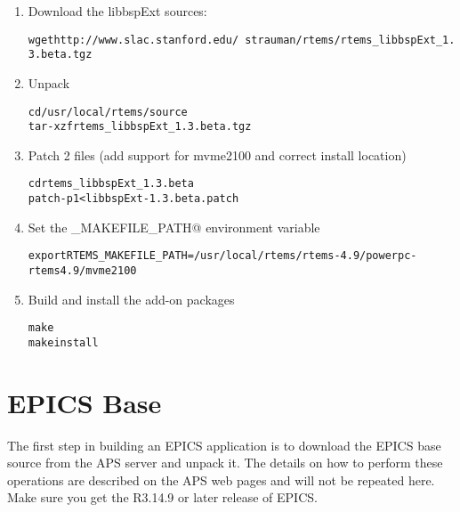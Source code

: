\documentclass{report}
\begin{document}
\begin{enumerate}
\item Download the libbspExt sources:
\begin{alltt}
wget http://www.slac.stanford.edu/~strauman/rtems/rtems_libbspExt_1.3.beta.tgz 
\end{alltt}

\item Unpack 
\begin{alltt}
cd /usr/local/rtems/source 
tar -xzf rtems_libbspExt_1.3.beta.tgz 
\end{alltt}

\item Patch 2 files (add support for mvme2100 and correct install location) 
\begin{alltt}
cd rtems_libbspExt_1.3.beta 
patch -p1 < libbspExt-1.3.beta.patch 
\end{alltt}
  
\item Set the \verb@RTEMS_MAKEFILE_PATH@ environment variable 
\begin{alltt}
export RTEMS_MAKEFILE_PATH=/usr/local/rtems/rtems-4.9/powerpc-rtems4.9/mvme2100 
\end{alltt}

\item Build and install the add-on packages 
\begin{alltt}
 make 
 make install 
\end{alltt}
\end{enumerate}

\chapter{EPICS Base}
The first step in building an EPICS application is to download the EPICS
base source from the APS server and unpack it.   The details on how
to perform these operations are described on the APS web pages and will
not be repeated here.  Make sure you get the R3.14.9 or later release of EPICS.
\end{document}
